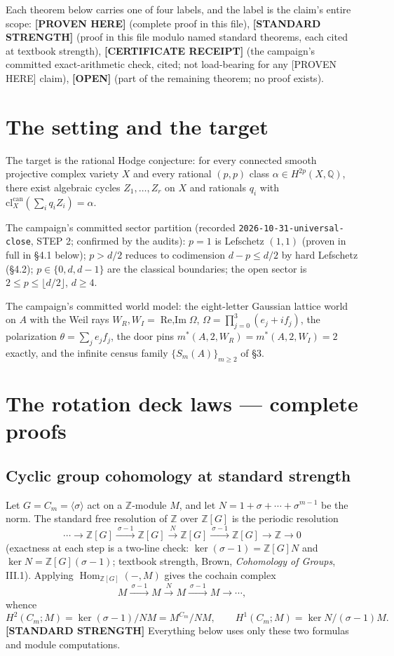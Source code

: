 \documentclass[11pt]{article}
\newcommand{\Z}{\mathbb Z}
\newcommand{\Q}{\mathbb Q}
\newcommand{\Hom}{\operatorname{Hom}}
\begin{document}
Each theorem below carries one of four labels, and the label is the
claim's entire scope:
\textbf{[PROVEN HERE]} (complete proof in this file),
\textbf{[STANDARD STRENGTH]} (proof in this file modulo named standard
theorems, each cited at textbook strength),
\textbf{[CERTIFICATE RECEIPT]} (the campaign's committed exact-arithmetic
check, cited; not load-bearing for any [PROVEN HERE] claim),
\textbf{[OPEN]} (part of the remaining theorem; no proof exists).

\section{The setting and the target}

The target is the rational Hodge conjecture: for every connected smooth
projective complex variety $X$ and every rational $(p,p)$ class
$\alpha\in H^{2p}(X,\Q)$, there exist algebraic cycles
$Z_1,\dots,Z_r$ on $X$ and rationals $q_i$ with
$\mathrm{cl}^{\mathrm{can}}_X(\sum_i q_i Z_i)=\alpha$.

The campaign's committed sector partition (recorded
\texttt{2026-10-31-universal-close}, STEP 2; confirmed by the audits):
$p=1$ is Lefschetz $(1,1)$ (proven in full in \S4.1 below);
$p>d/2$ reduces to codimension $d-p\le d/2$ by hard Lefschetz
(\S4.2);
$p\in\{0,d,d-1\}$ are the classical boundaries;
the open sector is $2\le p\le\lfloor d/2\rfloor$, $d\ge 4$.

The campaign's committed world model: the eight-letter Gaussian lattice
world on $A$ with the Weil rays $W_R,W_I=\operatorname{Re,Im}\Omega$,
$\Omega=\prod_{j=0}^{3}(e_j+if_j)$, the polarization
$\theta=\sum_j e_jf_j$, the door pins
$m^*(A,2,W_R)=m^*(A,2,W_I)=2$ exactly, and the infinite census family
$\{S_m(A)\}_{m\ge2}$ of \S3.

\section{The rotation deck laws --- complete proofs}

\subsection{Cyclic group cohomology at standard strength}

Let $G=C_m=\langle\sigma\rangle$ act on a $\Z$-module $M$, and let
$N=1+\sigma+\cdots+\sigma^{m-1}$ be the norm. The standard free
resolution of $\Z$ over $\Z[G]$ is the periodic resolution
\[
\cdots\to\Z[G]\xrightarrow{\ \sigma-1\ }\Z[G]\xrightarrow{\ N\ }
\Z[G]\xrightarrow{\ \sigma-1\ }\Z[G]\to\Z\to0
\]
(exactness at each step is a two-line check: $\ker(\sigma-1)=\Z[G]N$ and
$\ker N=\Z[G](\sigma-1)$; textbook strength, Brown,
\emph{Cohomology of Groups}, III.1). Applying
$\Hom_{\Z[G]}(-,M)$ gives the cochain complex
\[
M\xrightarrow{\ \sigma-1\ }M\xrightarrow{\ N\ }M\xrightarrow{\ \sigma-1\ }M\to\cdots,
\]
whence
\[
H^2(C_m;M)=\ker(\sigma-1)/NM=M^{C_m}/NM,\qquad
H^1(C_m;M)=\ker N/(\sigma-1)M.
\]
\textbf{[STANDARD STRENGTH]} Everything below uses only these two
formulas and module computations.
\end{document}

